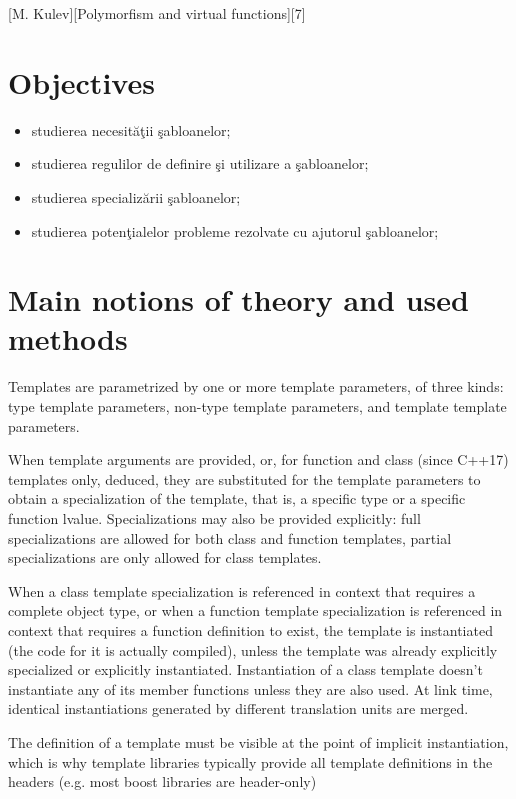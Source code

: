 \documentclass{article}
\begin{document}
	\def \reportSubj{Polymorfism and virtual functions}
	[M. Kulev][\reportSubj][7]

	\section{Objectives}
		\begin{itemize}
			\item studierea necesităţii şabloanelor;
			\item studierea regulilor de definire şi utilizare a şabloanelor;
			\item studierea specializării şabloanelor;
			\item studierea potenţialelor probleme rezolvate cu ajutorul şabloanelor;
		\end{itemize}

	\section{Main notions of theory and used methods}
		\par Templates are parametrized by one or more template parameters, of three kinds: type template parameters, non-type template parameters, and template template parameters.

		\par When template arguments are provided, or, for function and class (since C++17) templates only, deduced, they are substituted for the template parameters to obtain a specialization of the template, that is, a specific type or a specific function lvalue. Specializations may also be provided explicitly: full specializations are allowed for both class and function templates, partial specializations are only allowed for class templates.

		\par When a class template specialization is referenced in context that requires a complete object type, or when a function template specialization is referenced in context that requires a function definition to exist, the template is instantiated (the code for it is actually compiled), unless the template was already explicitly specialized or explicitly instantiated. Instantiation of a class template doesn't instantiate any of its member functions unless they are also used. At link time, identical instantiations generated by different translation units are merged.

		\par The definition of a template must be visible at the point of implicit instantiation, which is why template libraries typically provide all template definitions in the headers (e.g. most boost libraries are header-only)
\end{document}
